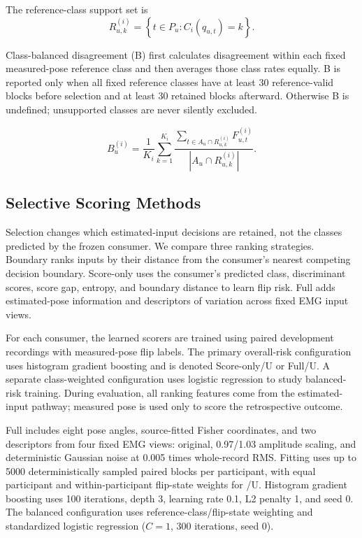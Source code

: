 The reference-class support set is
\begin{equation}\label{eq:reference-support}
R_{u,k}^{(i)}=\left\{t\in P_u:C_i(q_{u,t})=k\right\}.
\end{equation}

Class-balanced disagreement (B) first calculates disagreement within each fixed measured-pose reference class and then averages those class rates equally. B is reported only when all fixed reference classes have at least 30 reference-valid blocks before selection and at least 30 retained blocks afterward. Otherwise B is undefined; unsupported classes are never silently excluded.

\begin{equation}\label{eq:balanced}
B_u^{(i)}=\frac{1}{K_i}\sum_{k=1}^{K_i}
\frac{\sum_{t\in A_u\cap R_{u,k}^{(i)}}F_{u,t}^{(i)}}
{|A_u\cap R_{u,k}^{(i)}|}.
\end{equation}

\subsection{Selective Scoring Methods}\label{selective-scoring-methods}
Selection changes which estimated-input decisions are retained, not the classes predicted by the frozen consumer. We compare three ranking strategies. Boundary ranks inputs by their distance from the consumer's nearest competing decision boundary. Score-only uses the consumer's predicted class, discriminant scores, score gap, entropy, and boundary distance to learn flip risk. Full adds estimated-pose information and descriptors of variation across fixed EMG input views.

For each consumer, the learned scorers are trained using paired development recordings with measured-pose flip labels. The primary overall-risk configuration uses histogram gradient boosting and is denoted Score-only/U or Full/U. A separate class-weighted configuration uses logistic regression to study balanced-risk training. During evaluation, all ranking features come from the estimated-input pathway; measured pose is used only to score the retrospective outcome.

Full includes eight pose angles, source-fitted Fisher coordinates, and two descriptors from four fixed EMG views: original, 0.97/1.03 amplitude scaling, and deterministic Gaussian noise at 0.005 times whole-record RMS. Fitting uses up to 5000 deterministically sampled paired blocks per participant, with equal participant and within-participant flip-state weights for /U. Histogram gradient boosting uses 100 iterations, depth 3, learning rate 0.1, L2 penalty 1, and seed 0. The balanced configuration uses reference-class/flip-state weighting and standardized logistic regression (\(C=1\), 300 iterations, seed 0).



